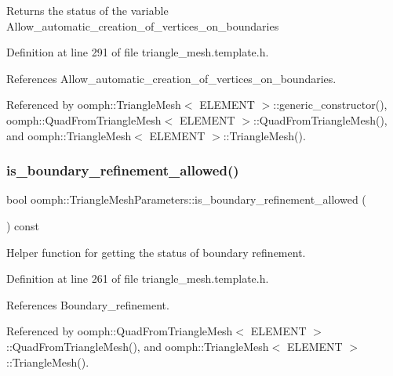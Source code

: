 Returns the status of the variable Allow\+\_\+automatic\+\_\+creation\+\_\+of\+\_\+vertices\+\_\+on\+\_\+boundaries 

Definition at line 291 of file triangle\+\_\+mesh.\+template.\+h.



References Allow\+\_\+automatic\+\_\+creation\+\_\+of\+\_\+vertices\+\_\+on\+\_\+boundaries.



Referenced by oomph\+::\+Triangle\+Mesh$<$ E\+L\+E\+M\+E\+N\+T $>$\+::generic\+\_\+constructor(), oomph\+::\+Quad\+From\+Triangle\+Mesh$<$ E\+L\+E\+M\+E\+N\+T $>$\+::\+Quad\+From\+Triangle\+Mesh(), and oomph\+::\+Triangle\+Mesh$<$ E\+L\+E\+M\+E\+N\+T $>$\+::\+Triangle\+Mesh().

\mbox{\label{classoomph_1_1TriangleMeshParameters_ae0091472702485eeb9b42c4d0d4021c4}} 
\subsubsection{\texorpdfstring{is\+\_\+boundary\+\_\+refinement\+\_\+allowed()}{is\_boundary\_refinement\_allowed()}}
{\footnotesize\ttfamily bool oomph\+::\+Triangle\+Mesh\+Parameters\+::is\+\_\+boundary\+\_\+refinement\+\_\+allowed (\begin{DoxyParamCaption}{ }\end{DoxyParamCaption}) const\hspace{0.3cm}{\ttfamily [inline]}}



Helper function for getting the status of boundary refinement. 



Definition at line 261 of file triangle\+\_\+mesh.\+template.\+h.



References Boundary\+\_\+refinement.



Referenced by oomph\+::\+Quad\+From\+Triangle\+Mesh$<$ E\+L\+E\+M\+E\+N\+T $>$\+::\+Quad\+From\+Triangle\+Mesh(), and oomph\+::\+Triangle\+Mesh$<$ E\+L\+E\+M\+E\+N\+T $>$\+::\+Triangle\+Mesh().

